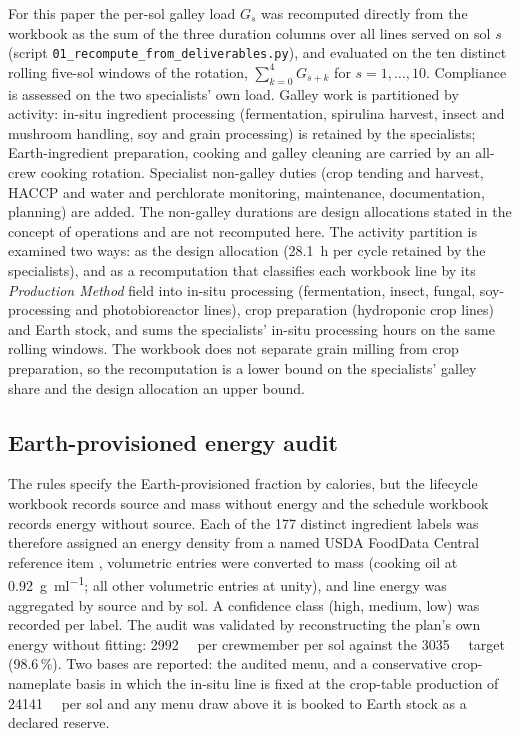 \documentclass[11pt,a4paper,3p,authoryear]{elsarticle}
\begin{document}
For this paper the per-sol galley load $G_s$ was recomputed directly from the workbook as the sum of the three duration columns over all lines served on sol $s$ (script \texttt{01\_recompute\_from\_deliverables.py}), and evaluated on the ten distinct rolling five-sol windows of the rotation, $\sum_{k=0}^{4} G_{s+k}$ for $s = 1,\dots,10$. Compliance is assessed on the two specialists' own load. Galley work is partitioned by activity: in-situ ingredient processing (fermentation, spirulina harvest, insect and mushroom handling, soy and grain processing) is retained by the specialists; Earth-ingredient preparation, cooking and galley cleaning are carried by an all-crew cooking rotation. Specialist non-galley duties (crop tending and harvest, HACCP and water and perchlorate monitoring, maintenance, documentation, planning) are added. The non-galley durations are design allocations stated in the concept of operations and are not recomputed here. The activity partition is examined two ways: as the design allocation (\SI{28.1}{\hour} per cycle retained by the specialists), and as a recomputation that classifies each workbook line by its \emph{Production Method} field into in-situ processing (fermentation, insect, fungal, soy-processing and photobioreactor lines), crop preparation (hydroponic crop lines) and Earth stock, and sums the specialists' in-situ processing hours on the same rolling windows. The workbook does not separate grain milling from crop preparation, so the recomputation is a lower bound on the specialists' galley share and the design allocation an upper bound.

\subsection{Earth-provisioned energy audit}\label{sec:audit-method}

The rules specify the Earth-provisioned fraction by calories, but the lifecycle workbook records source and mass without energy and the schedule workbook records energy without source. Each of the 177 distinct ingredient labels was therefore assigned an energy density from a named USDA FoodData Central reference item \citep{USDAfdc}, volumetric entries were converted to mass (cooking oil at \SI{0.92}{\gram\per\milli\litre}; all other volumetric entries at unity), and line energy was aggregated by source and by sol. A confidence class (high, medium, low) was recorded per label. The audit was validated by reconstructing the plan's own energy without fitting: \SI{2992}{\kilo\calorie} per crewmember per sol against the \SI{3035}{\kilo\calorie} target (98.6\,\%). Two bases are reported: the audited menu, and a conservative crop-nameplate basis in which the in-situ line is fixed at the crop-table production of \SI{24141}{\kilo\calorie} per sol and any menu draw above it is booked to Earth stock as a declared reserve.
\end{document}
